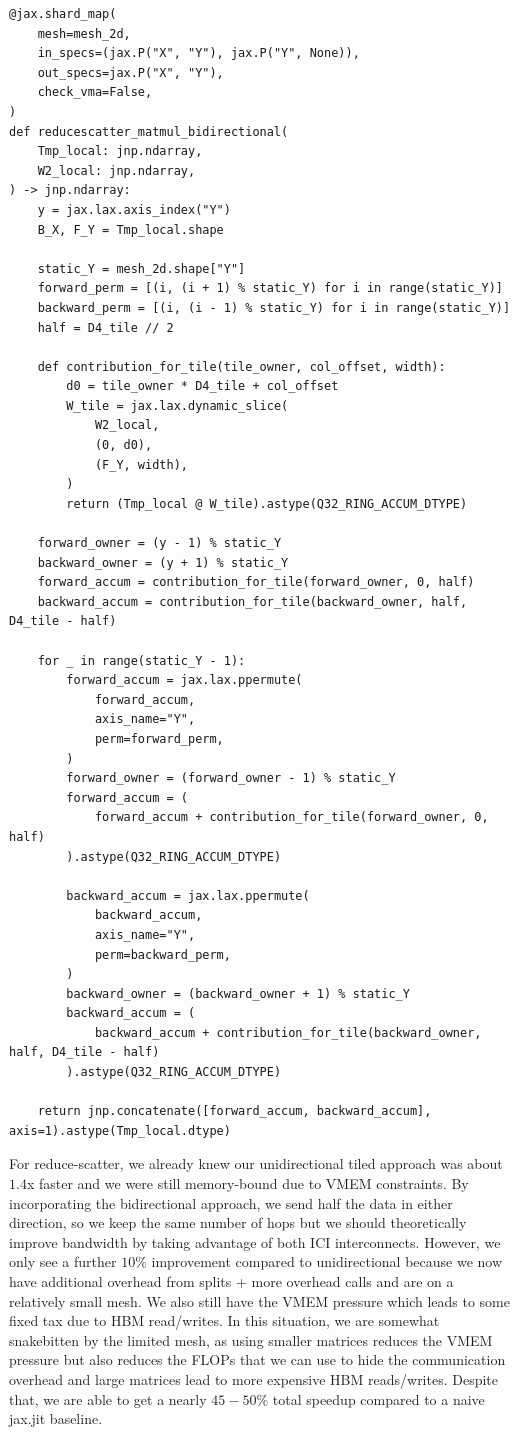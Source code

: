 \documentclass[11pt]{article}
\begin{document}
\begin{lstlisting}[style=pythoncode]
@jax.shard_map(
    mesh=mesh_2d,
    in_specs=(jax.P("X", "Y"), jax.P("Y", None)),
    out_specs=jax.P("X", "Y"),
    check_vma=False,
)
def reducescatter_matmul_bidirectional(
    Tmp_local: jnp.ndarray,
    W2_local: jnp.ndarray,
) -> jnp.ndarray:
    y = jax.lax.axis_index("Y")
    B_X, F_Y = Tmp_local.shape

    static_Y = mesh_2d.shape["Y"]
    forward_perm = [(i, (i + 1) % static_Y) for i in range(static_Y)]
    backward_perm = [(i, (i - 1) % static_Y) for i in range(static_Y)]
    half = D4_tile // 2

    def contribution_for_tile(tile_owner, col_offset, width):
        d0 = tile_owner * D4_tile + col_offset
        W_tile = jax.lax.dynamic_slice(
            W2_local,
            (0, d0),
            (F_Y, width),
        )
        return (Tmp_local @ W_tile).astype(Q32_RING_ACCUM_DTYPE)

    forward_owner = (y - 1) % static_Y
    backward_owner = (y + 1) % static_Y
    forward_accum = contribution_for_tile(forward_owner, 0, half)
    backward_accum = contribution_for_tile(backward_owner, half, D4_tile - half)

    for _ in range(static_Y - 1):
        forward_accum = jax.lax.ppermute(
            forward_accum,
            axis_name="Y",
            perm=forward_perm,
        )
        forward_owner = (forward_owner - 1) % static_Y
        forward_accum = (
            forward_accum + contribution_for_tile(forward_owner, 0, half)
        ).astype(Q32_RING_ACCUM_DTYPE)

        backward_accum = jax.lax.ppermute(
            backward_accum,
            axis_name="Y",
            perm=backward_perm,
        )
        backward_owner = (backward_owner + 1) % static_Y
        backward_accum = (
            backward_accum + contribution_for_tile(backward_owner, half, D4_tile - half)
        ).astype(Q32_RING_ACCUM_DTYPE)

    return jnp.concatenate([forward_accum, backward_accum], axis=1).astype(Tmp_local.dtype)
\end{lstlisting}

For reduce-scatter, we already knew our unidirectional tiled approach was about $1.4$x faster and we were
still memory-bound due to VMEM constraints. By incorporating the bidirectional approach, we send half the data
in either direction, so we keep the same number of hops but we should theoretically improve bandwidth by taking
advantage of both ICI interconnects. However, we only see a further $10\%$ improvement compared to 
unidirectional because we now have additional overhead from splits + more overhead calls and are on a 
relatively small mesh. We also still have the VMEM pressure which leads to some fixed tax due to HBM read/writes.
In this situation, we are somewhat snakebitten by the limited mesh, as using smaller matrices reduces the VMEM
pressure but also reduces the FLOPs that we can use to hide the communication overhead and large matrices lead
to more expensive HBM reads/writes. Despite that, we are able to get a nearly $45-50\%$ total speedup compared
to a naive jax.jit baseline.
\end{document}
